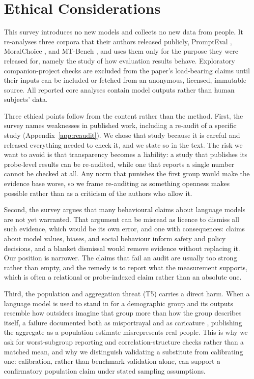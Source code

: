 \documentclass[11pt]{article}
\begin{document}
\section*{Ethical Considerations}

This survey introduces no new models and collects no new data from people. It
re-analyses three corpora that their authors released publicly, PromptEval
\cite{polo2024efficient}, MoralChoice \cite{scherrer2023evaluating}, and
MT-Bench \cite{zhengmt2023judging}, and uses them only for the purpose they were
released for, namely the study of how evaluation results behave. Exploratory
companion-project checks are excluded from the paper's load-bearing claims
until their inputs can be included or fetched from an anonymous, licensed,
immutable source. All reported core analyses contain model outputs rather than
human subjects' data.

Three ethical points follow from the content rather than the method. First, the
survey names weaknesses in published work, including a re-audit of a specific
study (Appendix~\ref{app:reaudit}). We chose that study because it is careful
and released everything needed to check it, and we state so in the text. The
risk we want to avoid is that transparency becomes a liability: a study that
publishes its probe-level results can be re-audited, while one that reports a
single number cannot be checked at all. Any norm that punishes the first group
would make the evidence base worse, so we frame re-auditing as something
openness makes possible rather than as a criticism of the authors who allow it.

Second, the survey argues that many behavioural claims about language models are
not yet warranted. That argument can be misread as licence to dismiss all such
evidence, which would be its own error, and one with consequences: claims about
model values, biases, and social behaviour inform safety and policy decisions,
and a blanket dismissal would remove evidence without replacing it. Our position
is narrower. The claims that fail an audit are usually too strong rather than
empty, and the remedy is to report what the measurement supports, which is
often a relational or probe-indexed claim rather than an absolute one.

Third, the population and aggregation threat (T5) carries a direct harm. When a
language model is used to stand in for a demographic group and its outputs
resemble how outsiders imagine that group more than how the group describes
itself, a failure documented both as misportrayal and as caricature
\cite{wang2025misportray,cheng2023compost}, publishing the aggregate as a
population estimate misrepresents real people. This is why we ask for worst-subgroup
reporting and correlation-structure checks rather than a matched mean, and why
we distinguish validating a substitute from calibrating one: calibration,
rather than benchmark validation alone, can support a confirmatory population
claim under stated sampling assumptions.
\end{document}
